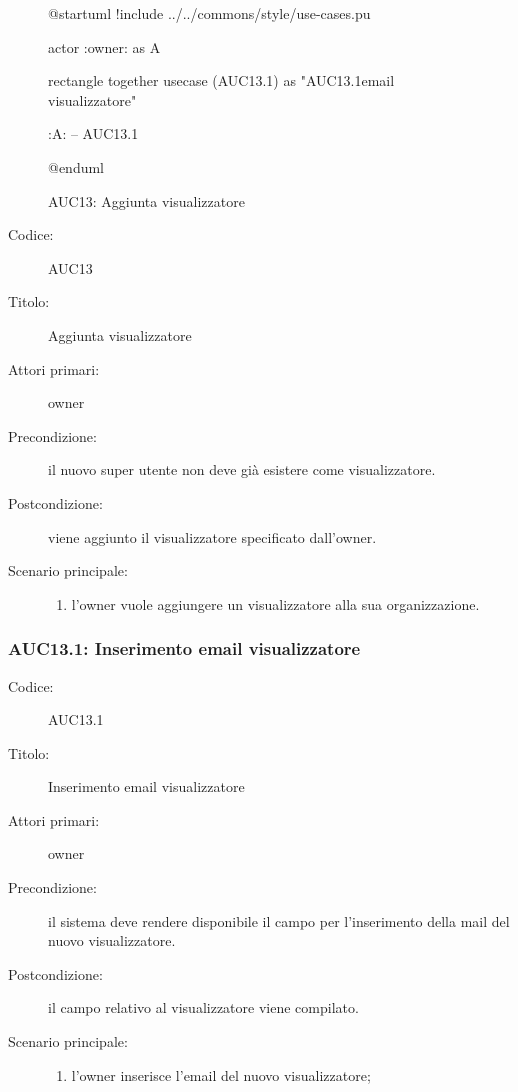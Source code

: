 \documentclass[../../../analisi-dei-requisiti.tex]{subfiles}
\begin{document}
\begin{figure}[H]
  \centering
  \begin{plantuml}
  @startuml
  !include ../../commons/style/use-cases.pu

  actor :owner: as A

  rectangle {
    together {
      usecase (AUC13.1) as "AUC13.1\nInserimento email visualizzatore"
    }
  }

  :A: -- AUC13.1

  @enduml
  \end{plantuml}
  \caption{AUC13: Aggiunta visualizzatore}%
  \label{fig:auc13}
\end{figure}

\begin{description}
  \item[Codice:] AUC13
  \item[Titolo:] Aggiunta visualizzatore
  \item[Attori primari:] owner
  \item[Precondizione:] il nuovo super utente non deve già esistere come visualizzatore.
  \item[Postcondizione:] viene aggiunto il visualizzatore specificato dall'owner.
  \item[Scenario principale:]
  \begin{enumerate}
    \item l'owner vuole aggiungere un visualizzatore alla sua organizzazione.
  \end{enumerate}
\end{description}

\subsubsection{AUC13.1: Inserimento email visualizzatore}%
\label{subs:AUC13.1}
\begin{description}
  \item[Codice:] AUC13.1
  \item[Titolo:] Inserimento email visualizzatore
  \item[Attori primari:] owner
  \item[Precondizione:] il sistema deve rendere disponibile il campo per l'inserimento della mail del nuovo visualizzatore.
  \item[Postcondizione:] il campo relativo al visualizzatore viene compilato.
  \item[Scenario principale:]
  \begin{enumerate}
    \item l'owner inserisce l'email del nuovo visualizzatore;
  \end{enumerate}
\end{description}
\end{document}

